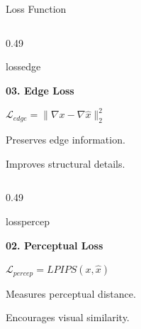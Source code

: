 ﻿\documentclass[
    11pt,%
    aspectratio=169,%
]{beamer}
\begin{document}
\begin{frame}{Loss Function}
\begin{columns}[T,onlytextwidth]

\begin{column}{0.49\textwidth}

\begin{beamercolorbox}[
    wd=\linewidth,
    sep=0.10cm,
    rounded=true
]{lossedge}

    {\color{LossNavy}\bfseries 03. Edge Loss}

    \vspace{0.10cm}

    \centering
    $\displaystyle
    \mathcal{L}_{edge}
    =
    \|\nabla x-\nabla\hat{x}\|_2^2
    $

    \vspace{0.08cm}

    \raggedright

    Preserves edge information.

    Improves structural details.

\end{beamercolorbox}

\end{column}

\end{columns}

\vspace{0.10cm}


\begin{columns}[T,onlytextwidth]


\begin{column}{0.49\textwidth}

\begin{beamercolorbox}[
    wd=\linewidth,
    sep=0.10cm,
    rounded=true
]{losspercep}

    {\color{LossNavy}\bfseries 02. Perceptual Loss}

    \vspace{0.10cm}

    \centering
    $\displaystyle
    \mathcal{L}_{percep}
    =
    LPIPS(x,\hat{x})
    $

    \vspace{0.08cm}

    \raggedright
    Measures perceptual distance.

    Encourages visual similarity.


\end{beamercolorbox}
\end{column}
\end{columns}
\end{frame}
\end{document}
